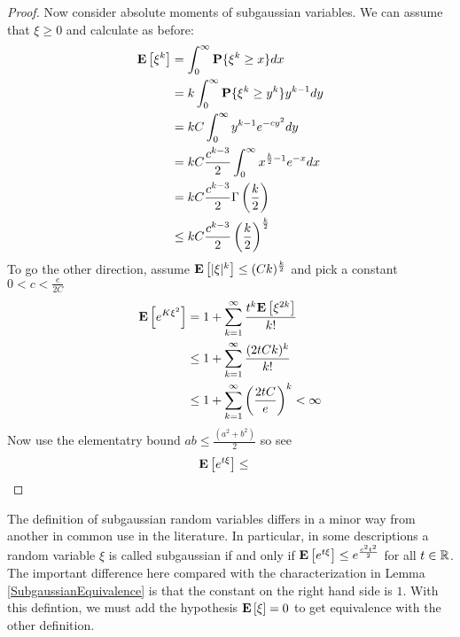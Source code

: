\documentclass{amsart}
\theoremstyle{remark}
\theoremstyle{definition}
\begin{document}
\begin{proof}
Now consider absolute moments of subgaussian variables.  We can assume
that $\xi \geq 0$ and calculate as before:
\begin{align*}
\textbf{E}\left[\xi^k\right] &= \int_0^\infty \textbf{P}\{\xi^k \geq x\} dx \\
&= k\int_0^\infty \textbf{P}\{\xi^k \geq y^k\} y^{k-1} dy \\
&= k C \int_0^\infty y^{k-1} e^{-cy^2} dy \\
&= k C \frac{c^{k-3}}{2} \int_0^\infty x^{\frac{k}{2}-1} e^{-x} dx \\
&= k C \frac{c^{k-3}}{2} \Gamma\left(\frac{k}{2}\right) \\
&\leq k C \frac{c^{k-3}}{2} \left(\frac{k}{2}\right)^\frac{k}{2} \\
\end{align*}
To go the other direction, assume $\textbf{E}\left[|\xi|^k\right] \leq
(Ck)^\frac{k}{2}$ and pick a constant $0 < c < \frac{e}{2C}$ 
\begin{align*}
\textbf{E}\left[e^{K\xi^2}\right] &= 1 + \sum_{k=1}^\infty
\frac{t^k\textbf{E}\left[\xi^{2k}\right]}{k!}\\
&\leq 1 + \sum_{k=1}^\infty
\frac{(2tCk)^k}{k!}\\
&\leq 1 + \sum_{k=1}^\infty
\left(\frac{2tC}{e}\right)^k < \infty \\
\end{align*}
Now use the elementatry bound $ab \leq \frac{(a^2 + b^2)}{2}$ so see
\begin{align*}
\textbf{E}\left[e^{t\xi}\right] &\leq 
\end{align*}
\end{proof}

The definition of subgaussian random variables differs in a minor way
from another in common use in the literature.  In particular, in some descriptions a random
variable $\xi$ is called subgaussian if and only if
$\textbf{E}\left[e^{t\xi}\right] \leq e^{\frac{c^2 t^2}{2}}$ for all $t \in \mathbb{R}$.  The important
difference here compared with the characterization in Lemma
\ref{SubgaussianEquivalence} is that the constant on the right hand side is $1$.
With this defintion, we must add the hypothesis $\textbf{E}\left[\xi\right]=0$
to get equivalence with the other definition.
\end{document}
